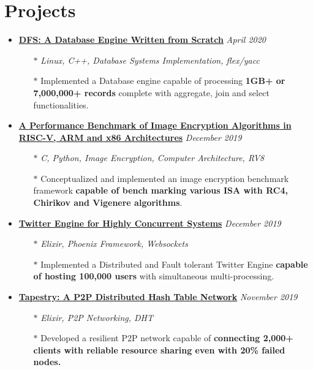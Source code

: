 \documentclass[10pt,a4paper]{article}
\begin{document}
\section{{\faCoffee} Projects}
	\begin{itemize}[noitemsep,nolistsep]

		\item{\textbf{\href{https://gitlab.com/r0ck3r008/database-from-scratch}{DFS: A Database Engine Written from Scratch}} \hfill \textit{April 2020}}
			\begin{itemize}[leftmargin=*]
				\setlength\itemsep{-0.25em}
				\item[$\ast$]{\textit{Linux, C++, Database Systems Implementation, flex/yacc}}
				\item[$\ast$]{Implemented a Database engine capable of processing \textbf{1GB+ or 7,000,000+ records} complete with aggregate, join and select functionalities.}
			\end{itemize}

		\item{\textbf{\href{https://gitlab.com/r0ck3r008/cap-proj}{A Performance Benchmark of Image Encryption Algorithms in RISC-V, ARM and x86 Architectures}} \hfill \textit{December 2019}}
			\begin{itemize}[leftmargin=*]
				\setlength\itemsep{-0.25em}
				\item[$\ast$]{\textit{C, Python, Image Encryption, Computer Architecture, RV8}}
				\item[$\ast$]{Conceptualized and implemented an image encryption benchmark framework \textbf{capable of bench marking various ISA with RC4, Chirikov and Vigenere algorithms}.}
			\end{itemize}

		\item{\textbf{\href{https://gitlab.com/r0ck3r008/twitter-engine}{Twitter Engine for Highly Concurrent Systems}} \hfill \textit{December 2019}}
			\begin{itemize}[leftmargin=*]
				\setlength\itemsep{-0.25em}
				\item[$\ast$]{\textit{Elixir, Phoenix Framework, Websockets}}
				\item[$\ast$]{Implemented a Distributed and Fault tolerant Twitter Engine \textbf{capable of hosting 100,000 users} with simultaneous multi-processing.}
			\end{itemize}

		\item{\textbf{\href{https://gitlab.com/r0ck3r008/dos-proj}{Tapestry: A P2P Distributed Hash Table Network}} \hfill \textit{November 2019}}
			\begin{itemize}[leftmargin=*]
				\setlength\itemsep{-0.25em}
				\item[$\ast$]{\textit{Elixir, P2P Networking, DHT}}
				\item[$\ast$]{Developed a resilient P2P network capable of \textbf{connecting 2,000+ clients with reliable resource sharing even with 20\% failed nodes.}}
			\end{itemize}


\end{itemize}
\end{document}
